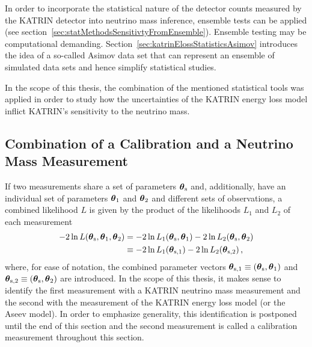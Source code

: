 In order to incorporate the statistical nature of the detector counts measured by the KATRIN detector into neutrino mass inference, ensemble tests can be applied (see section~\ref{sec:statMethodsSensitivtyFromEnsemble}). Ensemble testing may be computational demanding. Section~\ref{sec:katrinElossStatisticsAsimov} introduces the idea of a so-called Asimov data set that can represent an ensemble of simulated data sets and hence simplify statistical studies.

In the scope of this thesis, the combination of the mentioned statistical tools was applied in order to study how the uncertainties of the KATRIN energy loss model inflict KATRIN's sensitivity to the neutrino mass.

\subsection{Combination of a Calibration and a Neutrino Mass Measurement}
\label{sec:katrinElossStatisticsCombMeasurements}
If two measurements share a set of parameters $\boldsymbol{\mathbf{\theta}}_\mathrm{s}$ and, additionally, have an individual set of parameters $\boldsymbol{\mathbf{\theta}}_1$ and $\boldsymbol{\mathbf{\theta}}_2$ and different sets of observations, a combined likelihood $L$ is given by the product of the likelihoods $L_1$ and $L_2$ of each measurement~\cite{ReviewOfParticlePhysics}
\newcommand{\paramVecSOne}{\paramVec_\mathrm{s,1}}
\newcommand{\paramVecSTwo}{\paramVec_\mathrm{s,2}}
\begin{align}
-2\ln L(\paramVecShared, \paramVec_1, \paramVec_2) &=  
-2\ln L_1(\paramVecShared, \paramVec_1)
-2\ln L_2(\paramVecShared, \paramVec_2)
\nonumber \\
&\equiv
-2\ln L_1(\paramVecSOne)
-2\ln L_2(\paramVecSTwo)
\label{eq:katrinElossStatisticsCombinedLikelihood}
\comma
\end{align}
where, for ease of notation, the combined parameter vectors $\boldsymbol{\mathbf{\theta}}_\mathrm{s,1}\equiv(\boldsymbol{\mathbf{\theta}}_\mathrm{s},\boldsymbol{\mathbf{\theta}}_1)$ and 
$\boldsymbol{\mathbf{\theta}}_\mathrm{s,2}\equiv(\boldsymbol{\mathbf{\theta}}_\mathrm{s},\boldsymbol{\mathbf{\theta}}_2)$ are introduced. In the scope of this thesis, it makes sense to identify the first measurement with a KATRIN neutrino mass measurement and the second with the measurement of the KATRIN energy loss model (or the Aseev model). In order to emphasize generality, this identification is postponed until the end of this section and the second measurement is called a calibration measurement throughout this section.

